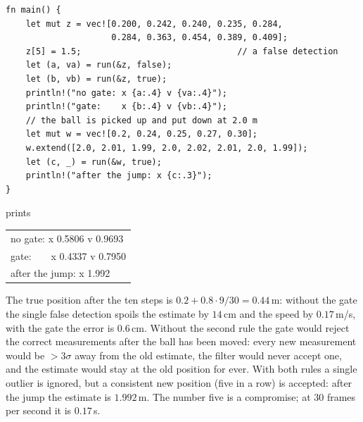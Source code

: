 \begin{enumerate}[label=\textbf{\ansnum.\arabic*}]
\begin{verbatim}
fn main() {
    let mut z = vec![0.200, 0.242, 0.240, 0.235, 0.284,
                     0.284, 0.363, 0.454, 0.389, 0.409];
    z[5] = 1.5;                               // a false detection
    let (a, va) = run(&z, false);
    let (b, vb) = run(&z, true);
    println!("no gate: x {a:.4} v {va:.4}");
    println!("gate:    x {b:.4} v {vb:.4}");
    // the ball is picked up and put down at 2.0 m
    let mut w = vec![0.2, 0.24, 0.25, 0.27, 0.30];
    w.extend([2.0, 2.01, 1.99, 2.0, 2.02, 2.01, 2.0, 1.99]);
    let (c, _) = run(&w, true);
    println!("after the jump: x {c:.3}");
}
\end{verbatim}
prints
\begin{center}\small\ttfamily
\begin{tabular}{@{}l@{}}
no gate: x 0.5806 v 0.9693\\
gate:\ \ \ \ x 0.4337 v 0.7950\\
after the jump: x 1.992
\end{tabular}
\end{center}
The true position after the ten steps is $0.2+0.8\cdot9/30=0.44$\,m: without the gate the single false detection spoils the estimate by $14$\,cm and the speed by $0.17$\,m/s, with the gate the error is $0.6$\,cm. Without the second rule the gate would reject the correct measurements after the ball has been moved: every new measurement would be $>3\sigma$ away from the old estimate, the filter would never accept one, and the estimate would stay at the old position for ever. With both rules a single outlier is ignored, but a consistent new position (five in a row) is accepted: after the jump the estimate is $1.992$\,m. The number five is a compromise; at $30$ frames per second it is $0.17$\,s.
\end{enumerate}
